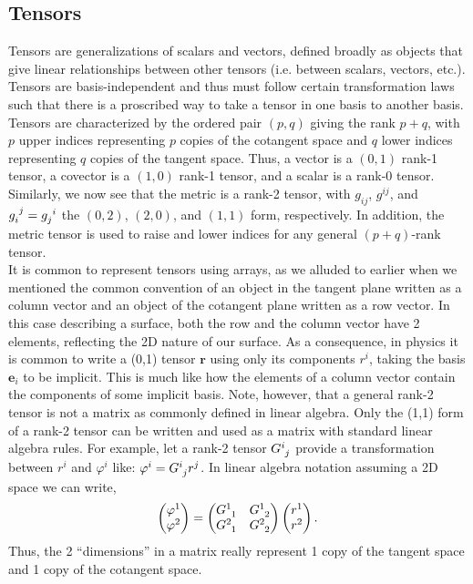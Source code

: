 \begin{appendices}
\section{Tensors}
Tensors are generalizations of scalars and vectors, defined broadly as objects that give linear relationships between other tensors (i.e. between scalars, vectors, etc.).
Tensors are basis-independent and thus must follow certain transformation laws such that there is a proscribed way to take a tensor in one basis to another basis.
Tensors are characterized by the ordered pair $(p,q)$ giving the rank $p + q$, with $p$ upper indices representing $p$ copies of the cotangent space and $q$ lower indices representing $q$ copies of the tangent space.
Thus, a vector is a $(0,1)$ rank-1 tensor, a covector is a $(1,0)$ rank-1 tensor, and a scalar is a rank-0 tensor.
Similarly, we now see that the metric is a rank-2 tensor, with $g_{ij}$, $g^{ij}$, and $\tensor{g}{_i^j} = \tensor{g}{_j^i}$ the $(0,2)$, $(2,0)$, and $(1,1)$ form, respectively.
In addition, the metric tensor is used to raise and lower indices for any general $(p + q)$-rank tensor. \\

It is common to represent tensors using arrays, as we alluded to earlier when we mentioned the common convention of an object in the tangent plane written as a column vector and an object of the cotangent plane written as a row vector.
In this case describing a surface, both the row and the column vector have 2 elements, reflecting the 2D nature of our surface.
As a consequence, in physics it is common to write a (0,1) tensor $\mathbf{r}$ using only its components $r^i$, taking the basis $\mathbf{e}_i$ to be implicit.
This is much like how the elements of a column vector contain the components of some implicit basis.
Note, however, that a general rank-2 tensor is not a matrix as commonly defined in linear algebra.
Only the (1,1) form of a rank-2 tensor can be written and used as a matrix with standard linear algebra rules.
For example, let a rank-2 tensor $\tensor{G}{^i_j}$ provide a transformation between $r^i$ and $\varphi^i$ like: $\varphi^i = \tensor{G}{^i_j}r^j$.
In linear algebra notation assuming a 2D space we can write,
\begin{equation}
  \begin{pmatrix}
    \varphi^1 \\
    \varphi^2
  \end{pmatrix} =
  \begin{pmatrix}
    \tensor{G}{^1_1} & \tensor{G}{^1_2} \\
    \tensor{G}{^2_1} & \tensor{G}{^2_2}
  \end{pmatrix}
  \begin{pmatrix}
    r^1 \\
    r^2
  \end{pmatrix}.
\end{equation}
Thus, the 2 ``dimensions'' in a matrix really represent 1 copy of the tangent space and 1 copy of the cotangent space. \\


\end{appendices}
